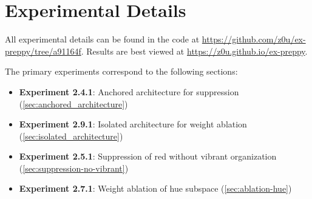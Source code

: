 \section{Experimental Details}

All experimental details can be found in the code at \url{https://github.com/z0u/ex-preppy/tree/a91164f}. Results are best viewed at \url{https://z0u.github.io/ex-preppy}.

The primary experiments correspond to the following sections:
\begin{itemize}
    \item \textbf{Experiment 2.4.1}: Anchored architecture for suppression (\cref{sec:anchored_architecture})
    \item \textbf{Experiment 2.9.1}: Isolated architecture for weight ablation (\cref{sec:isolated_architecture})
    \item \textbf{Experiment 2.5.1}: Suppression of red without vibrant organization (\cref{sec:suppression-no-vibrant})
    \item \textbf{Experiment 2.7.1}: Weight ablation of hue subspace (\cref{sec:ablation-hue})
\end{itemize}
